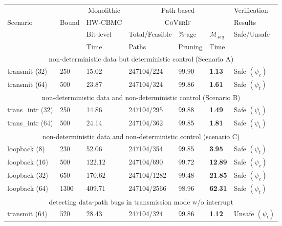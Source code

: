 \documentclass[sigconf]{acmart}
\newcommand{\tool}[1]{\textsc{#1}\xspace}
\newcommand{\verifox}{\tool{CoVerIf}}
\begin{document}
\begin{table}
\begin{center}
{
\begin{scriptsize}
\begin{tabular}{|l|l|l|l|l|l|l|}
\hline
  & & \multicolumn{1}{c|}{Monolithic} & \multicolumn{3}{c|}{Path-based} &
  Verification \\ 
\cline{3-6}
  Scenario & Bound & \multicolumn{1}{c|}{HW-CBMC} & \multicolumn{3}{c|}{\verifox} &
  Results \\ 
\cline{3-7}
      &       &  Bit-level & Total/Feasible & \%-age & $\mathcal{M}_{seq}$ &
      Safe/Unsafe \\
  \cline{3-3}\cline{6-6}
      &       &   Time     & Paths & Pruning & Time &  \\
\cline{1-7}      
\multicolumn{7}{|c|}{non-deterministic data but deterministic control (Scenario A)} \\ \hline
  transmit (32) & 250 & 15.02 & 247104/224 & 99.90 & \textbf{1}.\textbf{13} &
  Safe $(\psi_{c})$ \\ 
transmit (64) & 500 & 23.87 & 247104/324 & 99.86 &
  \textbf{1}.\textbf{61}  & Safe $(\psi_{t})$ \\ \hline 
\multicolumn{7}{|c|}{non-deterministic data and non-deterministic control
(Scenario B)} \\ \hline
  trans\_intr (32) & 250 & 14.86 & 247104/295 & 99.88 & \textbf{1}.\textbf{49} &
  Safe $(\psi_{t})$ \\
  trans\_intr (64) & 500 & 24.14 & 247104/362 & 99.85 & \textbf{1}.\textbf{81}
  & Safe $(\psi_{t})$ \\ \hline
\multicolumn{7}{|c|}{non-deterministic data and non-deterministic control
(scenario C)} \\ \hline
  loopback (8)  & 230 & 52.06 & 247104/354 & 99.85 & \textbf{3}.\textbf{95} &
  Safe $(\psi_{t})$ \\ 
  loopback (16) & 500 & 122.12 & 247104/690 & 99.72 & \textbf{12}.\textbf{89} &
  Safe $(\psi_{c})$ \\ 
  loopback (32) & 650 & 170.62 & 247104/1282 & 99.48 & \textbf{21}.\textbf{85} &
  Safe $(\psi_{c})$ \\ 
  loopback (64) & 1300 & 409.71 & 247104/2566 & 98.96 & \textbf{62}.\textbf{31}
  & Safe $(\psi_{t})$ \\ \hline
\multicolumn{7}{|c|}{detecting data-path bugs in transmission mode w/o interrupt} \\ \hline
  transmit (64) & 520 & 28.43 & 247104/324 & 99.86 &
  \textbf{1}.\textbf{12} & Unsafe $(\psi_{t})$ \\ \hline

\end{tabular}
\end{scriptsize}}
\end{center}
\end{table}
\end{document}
